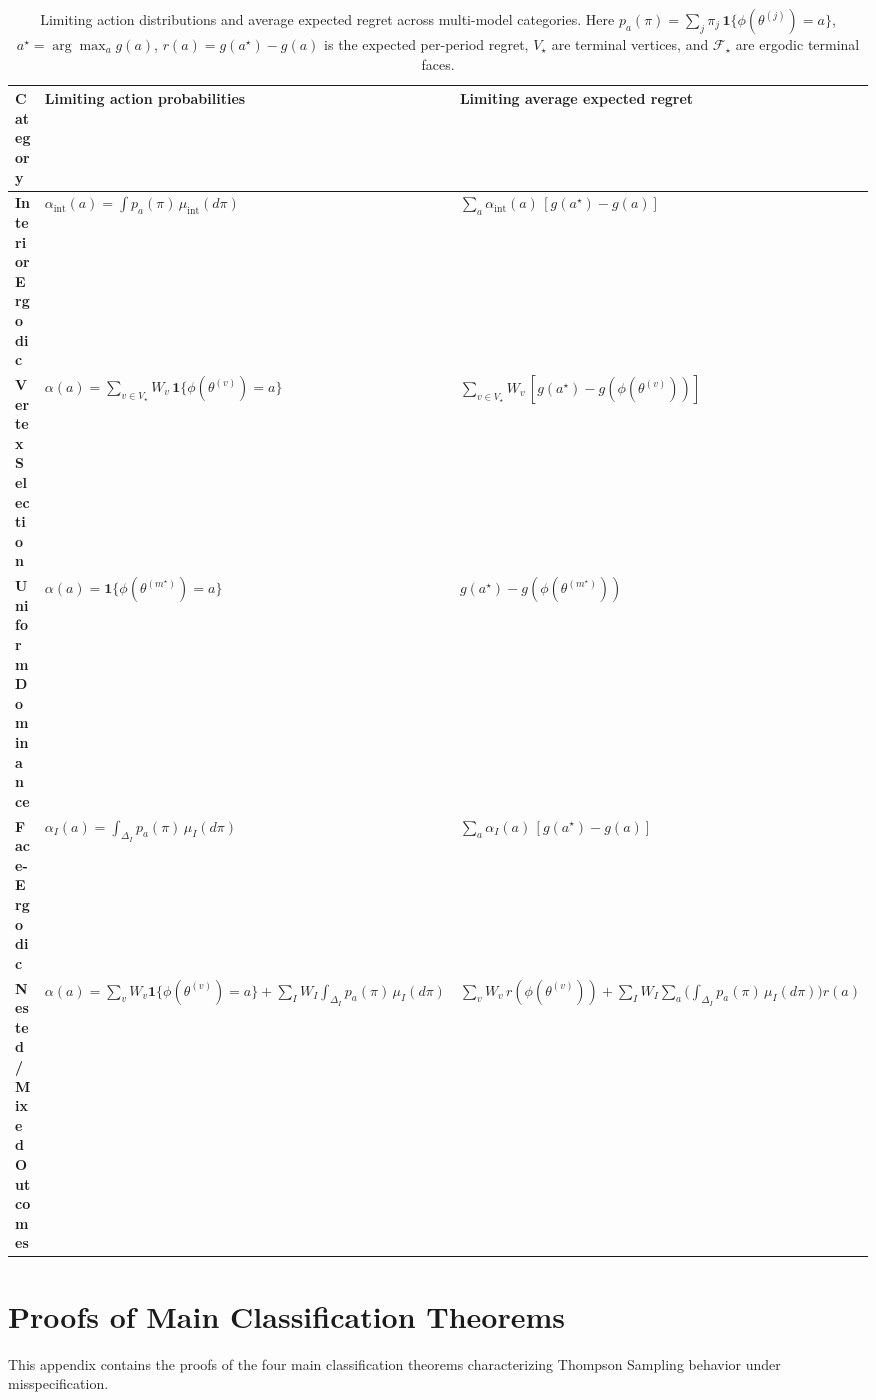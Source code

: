 \documentclass[12pt]{article}
\begin{document}
\begin{table}[H]
\centering
\renewcommand{\arraystretch}{1.2}
\footnotesize
\begin{tabular}{|p{3cm}|p{4.5cm}|p{7.5cm}|}
\hline
\textbf{Category} 
& \textbf{Limiting action probabilities} 
& \textbf{Limiting average expected regret} \\
\hline
\textbf{Interior Ergodic} 
& {\scriptsize $\alpha_{\mathrm{int}}(a)=\int p_a(\pi)\, \mu_{\mathrm{int}}(d\pi)$} 
& {\scriptsize $\displaystyle \sum_a \alpha_{\mathrm{int}}(a)\, [g(a^\star)-g(a)]$} \\
\hline
\textbf{Vertex Selection} 
& {\scriptsize $\alpha(a)=\sum_{v\in V_\star} W_v\,\mathbf{1}\{\phi(\theta^{(v)})=a\}$} 
& {\scriptsize $\displaystyle \sum_{v\in V_\star} W_v\, [g(a^\star)-g(\phi(\theta^{(v)}))]$} \\
\hline
\textbf{Uniform \newline Dominance} 
& {\scriptsize $\alpha(a)=\mathbf{1}\{\phi(\theta^{(m^\star)})=a\}$} 
& {\scriptsize $g(a^\star)-g(\phi(\theta^{(m^\star)}))$} \\
\hline
\textbf{Face-Ergodic} 
& {\scriptsize $\alpha_I(a)=\int_{\Delta_I} p_a(\pi)\, \mu_I(d\pi)$} 
& {\scriptsize $\displaystyle \sum_a \alpha_I(a)\,[g(a^\star)-g(a)]$} \\
\hline
\textbf{Nested/Mixed Outcomes} 
& {\scriptsize $\alpha(a)=\sum_{v} W_v \mathbf{1}\{\phi(\theta^{(v)})=a\}+\sum_I W_I \int_{\Delta_I} p_a(\pi)\,\mu_I(d\pi)$} 
& {\scriptsize $\displaystyle \sum_{v} W_v\, r(\phi(\theta^{(v)}))+\sum_I W_I \sum_a \Big(\int_{\Delta_I} p_a(\pi)\,\mu_I(d\pi)\Big) r(a)$} \\
\hline
\end{tabular}
\caption{Limiting action distributions and average expected regret across multi-model categories. 
Here $p_a(\pi)=\sum_j \pi_j\,\mathbf{1}\{\phi(\theta^{(j)})=a\}$, $a^\star=\arg\max_a g(a)$, $r(a)=g(a^\star)-g(a)$ is the expected per-period regret, $V_\star$ are terminal vertices, and $\mathcal F_\star$ are ergodic terminal faces.}
\label{tab:mm_regret_table}
\end{table}

\section{Proofs of Main Classification Theorems}
\label{app:D}

This appendix contains the proofs of the four main classification theorems characterizing Thompson Sampling behavior under misspecification.
\end{document}
